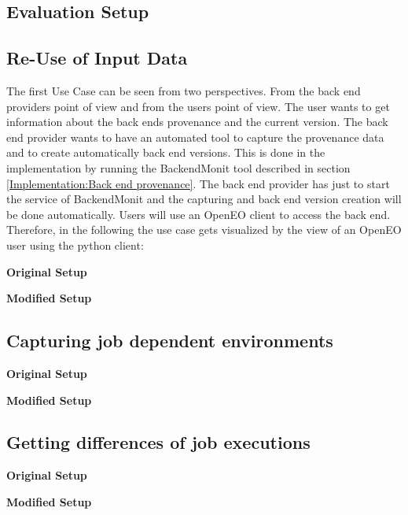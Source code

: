 \documentclass[draft,final]{vutinfth} %
\begin{document}
\subsection{Evaluation Setup}\label{Evaluation:Setup}

\subsection{Re-Use of Input Data}\label{Evaluation:Use Case1}
The first Use Case can be seen from two perspectives. From the back end providers point of view and from the users point of view. The user wants to get information about the back ends provenance and the current version. The back end provider wants to have an automated tool to capture the provenance data and to create automatically back end versions. This is done in the implementation by running the BackendMonit tool described in section \ref{Implementation:Back end provenance}. The back end provider has just to start the service of BackendMonit and the capturing and back end version creation will be done automatically. 
Users will use an OpenEO client to access the back end. Therefore, in the following the use case gets visualized by the view of an OpenEO user using the python client: 

\textbf{Original Setup}

\textbf{Modified Setup}



\subsection{Capturing job dependent environments}\label{Evaluation:Use Case2}

\textbf{Original Setup}

\textbf{Modified Setup}

\subsection{Getting differences of job executions}\label{Evaluation:Use Case3}

\textbf{Original Setup}

\textbf{Modified Setup}
\end{document}
